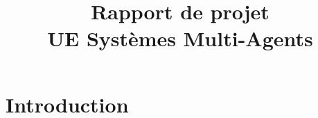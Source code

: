 \documentclass[a4paper]{article}
\begin{document}
	


	\title{Rapport de projet\\UE Systèmes Multi-Agents}

	  \begin{titlepage}
	    \def\titletype{Systèmes Multi-Agent}
	    \def\majortitle{Rapport Projet ... : ... Coordination de drône ... ?}
	    \def\docversion{1.0}
	    
	  \end{titlepage}

    \newpage
    \tableofcontents
    \newpage


    \section{Introduction}
        
		\paragraph{}
		

        
    
    \newpage


    \section{}
        
\end{document}
